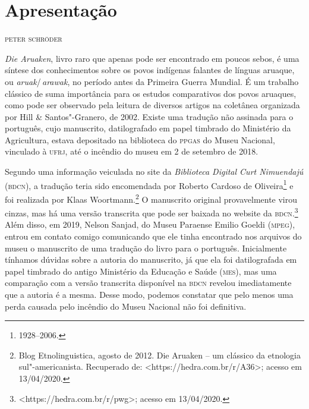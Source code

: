 \newcommand{\subtitulo}[1]{\NoCaseChange{\textnormal{\break\Large\itshape#1}}}
\chapter*{Apresentação\smallskip\subtitulo{Um clássico da etnologia\\ sul-americanista}}

\begin{flushright}
\textsc{peter schröder}\medskip
\end{flushright}

\textit{Die Aruaken}, livro raro que apenas pode ser encontrado em poucos
sebos, é uma síntese dos conhecimentos sobre os povos indígenas falantes
de línguas aruaque, ou \textit{aruak}/\,\textit{arawak}, no período antes da Primeira Guerra Mundial. É um trabalho clássico de suma importância para os
estudos comparativos dos povos aruaques, como pode ser observado pela
leitura de diversos artigos na coletânea organizada por Hill \&
Santos"-Granero, de 2002. Existe uma tradução não assinada para o
português, cujo manuscrito, datilografado em papel timbrado do
Ministério da Agricultura, estava depositado na biblioteca do \textsc{ppgas} do
Museu Nacional, vinculado à \textsc{ufrj}, até o incêndio do museu em 2 de setembro de 2018.

Segundo uma informação veiculada no site da \textit{Biblioteca Digital
Curt Nimuendajú} (\textsc{bdcn}), a tradução teria sido encomendada por Roberto
Cardoso de Oliveira\footnote{1928--2006.} e foi realizada por Klaas Woortmann.\footnote{Blog Etnolinguistica, agosto de 2012. Die Aruaken --
  um clássico da etnologia sul"-americanista. Recuperado de:
  \textless{}https://hedra.com.br/r/A36\textgreater{};
  acesso em 13/04/2020.} O manuscrito original provavelmente virou
cinzas, mas há uma versão transcrita que pode ser baixada no website da
\textsc{bdcn}.\footnote{\textless{}https://hedra.com.br/r/pwg\textgreater{};
  acesso em 13/04/2020.} Além disso, em 2019, Nelson Sanjad, do Museu
Paraense Emilio Goeldi (\textsc{mpeg}), entrou em contato comigo comunicando que
ele tinha encontrado nos arquivos do museu o manuscrito de uma tradução
do livro para o português. Inicialmente tínhamos dúvidas sobre a
autoria do manuscrito, já que ela foi datilografada em papel timbrado do
antigo Ministério da Educação e Saúde (\textsc{mes}), mas uma comparação com a
versão transcrita disponível na \textsc{bdcn} revelou imediatamente que a autoria
é a mesma. Desse modo, podemos constatar que pelo menos uma perda
causada pelo incêndio do Museu Nacional não foi definitiva.

